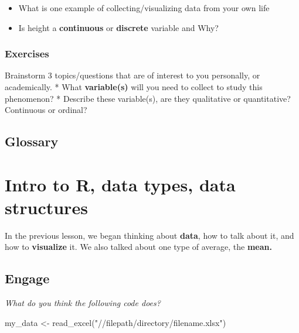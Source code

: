 \documentclass[
]{book}
\newenvironment{Shaded}{\begin{snugshade}}{\end{snugshade}}
\newcommand{\FunctionTok}[1]{\textcolor[rgb]{0.00,0.00,0.00}{#1}}
\newcommand{\NormalTok}[1]{#1}
\newcommand{\OtherTok}[1]{\textcolor[rgb]{0.56,0.35,0.01}{#1}}
\newcommand{\StringTok}[1]{\textcolor[rgb]{0.31,0.60,0.02}{#1}}
\providecommand{\tightlist}{%
  \setlength{\itemsep}{0pt}\setlength{\parskip}{0pt}}
\begin{document}
\begin{itemize}
\tightlist
\item
  What is one example of collecting/visualizing data from your own life
\item
  Is height a \textbf{continuous} or \textbf{discrete} variable and Why?
\end{itemize}

\hypertarget{exercises}{%
\subsection{Exercises}\label{exercises}}

Brainstorm 3 topics/questions that are of interest to you personally, or academically.
* What \textbf{variable(s)} will you need to collect to study this phenomenon?
* Describe these variable(s), are they qualitative or quantitative? Continuous or ordinal?

\hypertarget{glossary}{%
\section*{Glossary}\label{glossary}}

\hypertarget{intro-to-r-data-types-data-structures}{%
\chapter{Intro to R, data types, data structures}\label{intro-to-r-data-types-data-structures}}

In the previous lesson, we began thinking about \textbf{data}, how to talk about it,
and how to \textbf{visualize} it. We also talked about one type of average, the \textbf{mean.}

\hypertarget{engage}{%
\section{Engage}\label{engage}}

\emph{What do you think the following code does?}

\begin{Shaded}
\begin{Highlighting}[]
\NormalTok{my\_data }\OtherTok{\textless{}{-}} \FunctionTok{read\_excel}\NormalTok{(}\StringTok{"//filepath/directory/filename.xlsx"}\NormalTok{)}
\end{Highlighting}
\end{Shaded}
\end{document}

